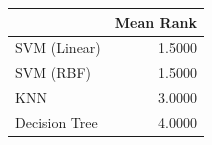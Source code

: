 \begin{tabular}{lr}
\toprule
 & Mean Rank \\
\midrule
SVM (Linear) & 1.5000 \\
SVM (RBF) & 1.5000 \\
KNN & 3.0000 \\
Decision Tree & 4.0000 \\
\bottomrule
\end{tabular}
